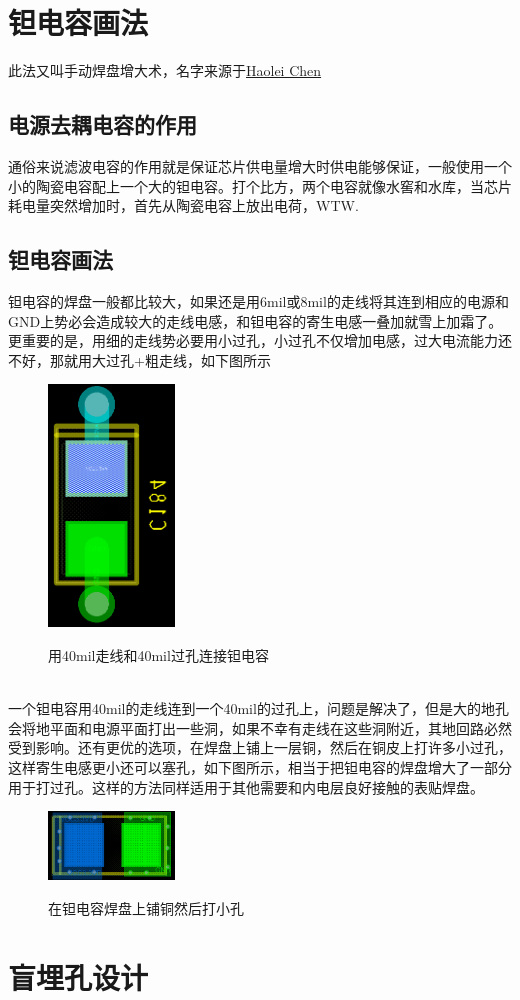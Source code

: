 \documentclass[color=green,mathpazo,titlestyle=hang,11pt]{elegantbook}
\begin{document}
\section{钽电容画法}
此法又叫手动焊盘增大术，名字来源于\href{mailto:chl1111@mail.ustc.edu.cn}{Haolei Chen}
\subsection{电源去耦电容的作用}
通俗来说滤波电容的作用就是保证芯片供电量增大时供电能够保证，一般使用一个小的陶瓷电容配上一个大的钽电容。打个比方，两个电容就像水窖和水库，当芯片耗电量突然增加时，首先从陶瓷电容上放出电荷，WTW.
\subsection{钽电容画法}
钽电容的焊盘一般都比较大，如果还是用6mil或8mil的走线将其连到相应的电源和GND上势必会造成较大的走线电感，和钽电容的寄生电感一叠加就雪上加霜了。更重要的是，用细的走线势必要用小过孔，小过孔不仅增加电感，过大电流能力还不好，那就用大过孔+粗走线，如下图所示
\begin{figure}[htb]
	\centering
	\includegraphics[width=0.3\textwidth]{figures/CapacitorWith40milVia.png}
	\label{Fig:CapacitorWith40milVia}
	\caption{用40mil走线和40mil过孔连接钽电容}
\end{figure}
\\一个钽电容用40mil的走线连到一个40mil的过孔上，问题是解决了，但是大的地孔会将地平面和电源平面打出一些洞，如果不幸有走线在这些洞附近，其地回路必然受到影响。还有更优的选项，在焊盘上铺上一层铜，然后在铜皮上打许多小过孔，这样寄生电感更小还可以塞孔，如下图所示，相当于把钽电容的焊盘增大了一部分用于打过孔。这样的方法同样适用于其他需要和内电层良好接触的表贴焊盘。
\begin{figure}[htb]
	\centering
	\includegraphics[width=0.3\textwidth]{figures/CapacitorWithShape.png}
	\label{fig:CapacitorWithShape}
	\caption{在钽电容焊盘上铺铜然后打小孔}
\end{figure}

\section{盲埋孔设计}
\end{document}

